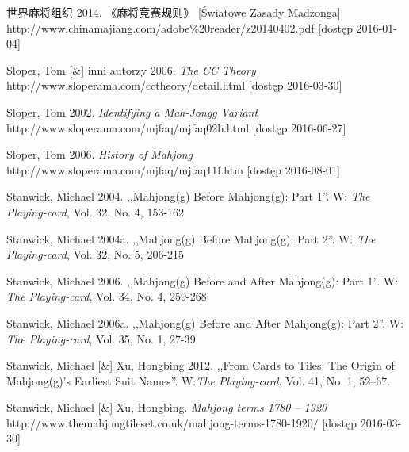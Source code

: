  世界麻将组织 2014. 《麻将竞赛规则》 [Światowe Zasady Madżonga]
\\http://www.chinamajiang.com/adobe\%20reader/z20140402.pdf [dostęp 2016-01-04]

Sloper, Tom [\&] inni autorzy 2006. \textit{The CC Theory}
\\http://www.sloperama.com/cctheory/detail.html [dostęp
2016-03-30]

Sloper, Tom 2002. \textit{Identifying a Mah-Jongg Variant}
\\http://www.sloperama.com/mjfaq/mjfaq02b.html [dostęp
2016-06-27]

Sloper, Tom 2006. \textit{History of Mahjong}
\\http://www.sloperama.com/mjfaq/mjfaq11f.htm [dostęp 2016-08-01]

Stanwick, Michael 2004. ,,Mahjong(g) Before Mahjong(g): Part 1''. W:
\textit{The Playing-card}, Vol. 32, No. 4, 153-162

Stanwick, Michael 2004a. ,,Mahjong(g) Before Mahjong(g): Part 2''. W:
\textit{The Playing-card}, Vol. 32, No. 5, 206-215

Stanwick, Michael 2006. ,,Mahjong(g) Before and After Mahjong(g): Part 1''. W:
\textit{The Playing-card}, Vol. 34, No. 4, 259-268

Stanwick, Michael 2006a. ,,Mahjong(g) Before and After Mahjong(g): Part 2''. W:
\textit{The Playing-card}, Vol. 35, No. 1, 27-39


Stanwick, Michael [\&] Xu, Hongbing 2012. ,,From Cards to Tiles: The Origin of
\mbox{Mahjong(g)'s} Earliest Suit Names''. W:\textit{The Playing-card}, Vol. 41,
No.
1, 52–67.

Stanwick, Michael [\&] Xu, Hongbing. \textit{Mahjong terms 1780 – 1920}
\\http://www.themahjongtileset.co.uk/mahjong-terms-1780-1920/ [dostęp
2016-03-30]

